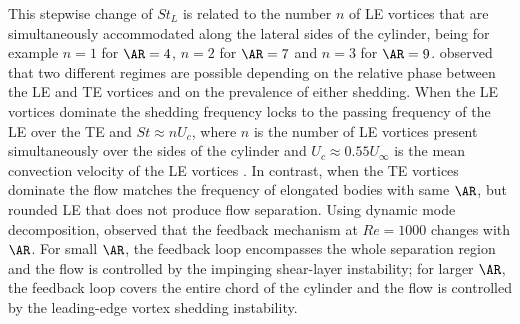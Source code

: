 This stepwise change of $St_L$ is related to the number $n$ of LE vortices that are simultaneously accommodated along the lateral sides of the cylinder, being for example $n=1$ for $\AR=4$, $n=2$ for $\AR=7$ and $n=3$ for $\AR=9$. \cite{chiarini-quadrio-auteri-2022} observed that two different regimes are possible depending on the relative phase between the LE and TE vortices and on the prevalence of either shedding. When the LE vortices dominate the shedding frequency locks to the passing frequency of the LE over the TE and $St \approx n U_c$, where $n$ is the number of LE vortices present simultaneously over the sides of the cylinder and $U_c \approx 0.55 U_\infty$ is the mean convection velocity of the LE vortices \citep[see also][]{mills-sheridan-hourigan-2002,tan-thompson-hourigan-2004}. In contrast, when the TE vortices dominate the flow matches the frequency of elongated bodies with same $\AR$, but rounded LE that does not produce flow separation. Using dynamic mode decomposition, \cite{zhang-etal-2023} observed that the feedback mechanism at $Re = 1000$ changes with $\AR$. For small $\AR$, the feedback loop encompasses the whole separation region and the flow is controlled by the impinging shear-layer instability; for larger $\AR$, the feedback loop covers the entire chord of the cylinder and the flow is controlled by the leading-edge vortex shedding instability.
  

